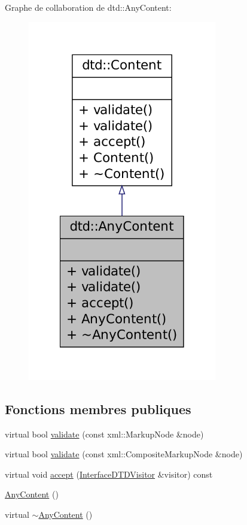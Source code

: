 Graphe de collaboration de dtd::AnyContent:\nopagebreak
\begin{figure}[H]
\begin{center}
\leavevmode
\includegraphics[width=234pt]{classdtd_1_1_any_content__coll__graph}
\end{center}
\end{figure}
\subsection*{Fonctions membres publiques}
\begin{DoxyCompactItemize}
\item 
virtual bool \hyperlink{classdtd_1_1_any_content_a1c69a5e152cec9428a72b83e1a86da67}{validate} (const xml::MarkupNode \&node)
\item 
virtual bool \hyperlink{classdtd_1_1_any_content_a6bd017d55e1c6eb09bdb7944afe57ab2}{validate} (const xml::CompositeMarkupNode \&node)
\item 
virtual void \hyperlink{classdtd_1_1_any_content_ae9e5cecd79f91449de424a24944295cf}{accept} (\hyperlink{classdtd_1_1_interface_d_t_d_visitor}{InterfaceDTDVisitor} \&visitor) const 
\item 
\hyperlink{classdtd_1_1_any_content_a1747b428c9253e03e9926d777dc577bc}{AnyContent} ()
\item 
virtual \hyperlink{classdtd_1_1_any_content_a30639c2b4d84eab8288d81e61ae4ba2a}{$\sim$AnyContent} ()
\end{DoxyCompactItemize}


